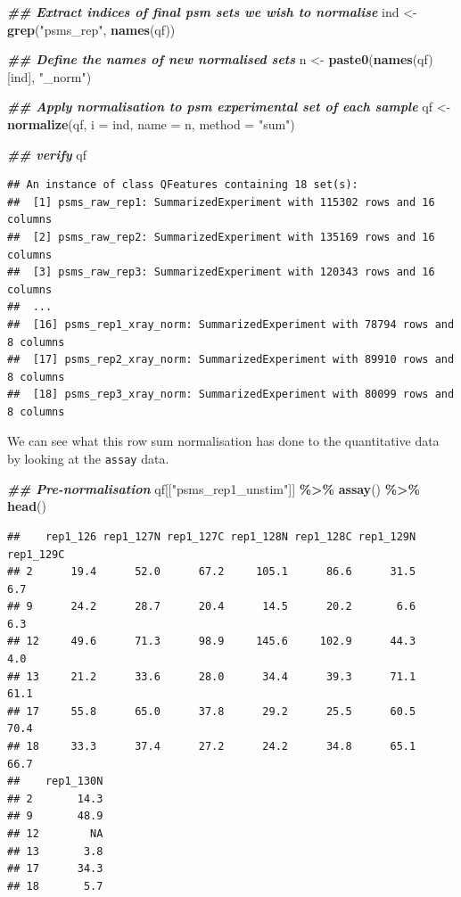 \documentclass[9pt,a4paper,]{extarticle}
\newenvironment{Shaded}{\begin{snugshade}}{\end{snugshade}}
\newcommand{\AttributeTok}[1]{\textcolor[rgb]{0.13,0.29,0.53}{#1}}
\newcommand{\DocumentationTok}[1]{\textcolor[rgb]{0.56,0.35,0.01}{\textbf{\textit{#1}}}}
\newcommand{\FunctionTok}[1]{\textcolor[rgb]{0.13,0.29,0.53}{\textbf{#1}}}
\newcommand{\NormalTok}[1]{#1}
\newcommand{\OtherTok}[1]{\textcolor[rgb]{0.56,0.35,0.01}{#1}}
\newcommand{\SpecialCharTok}[1]{\textcolor[rgb]{0.81,0.36,0.00}{\textbf{#1}}}
\newcommand{\StringTok}[1]{\textcolor[rgb]{0.31,0.60,0.02}{#1}}
\begin{document}
\begin{Shaded}
\begin{Highlighting}[]
\DocumentationTok{\#\# Extract indices of final psm sets we wish to normalise}
\NormalTok{ind }\OtherTok{\textless{}{-}} \FunctionTok{grep}\NormalTok{(}\StringTok{"psms\_rep"}\NormalTok{, }\FunctionTok{names}\NormalTok{(qf))}

\DocumentationTok{\#\# Define the names of new normalised sets}
\NormalTok{n }\OtherTok{\textless{}{-}} \FunctionTok{paste0}\NormalTok{(}\FunctionTok{names}\NormalTok{(qf)[ind], }\StringTok{"\_norm"}\NormalTok{)}

\DocumentationTok{\#\# Apply normalisation to psm experimental set of each sample}
\NormalTok{qf }\OtherTok{\textless{}{-}} \FunctionTok{normalize}\NormalTok{(qf, }
                \AttributeTok{i =}\NormalTok{ ind, }
                \AttributeTok{name =}\NormalTok{ n, }
                \AttributeTok{method =} \StringTok{"sum"}\NormalTok{)}

\DocumentationTok{\#\# verify}
\NormalTok{qf}
\end{Highlighting}
\end{Shaded}

\begin{verbatim}
## An instance of class QFeatures containing 18 set(s):
##  [1] psms_raw_rep1: SummarizedExperiment with 115302 rows and 16 columns 
##  [2] psms_raw_rep2: SummarizedExperiment with 135169 rows and 16 columns 
##  [3] psms_raw_rep3: SummarizedExperiment with 120343 rows and 16 columns 
##  ...
##  [16] psms_rep1_xray_norm: SummarizedExperiment with 78794 rows and 8 columns 
##  [17] psms_rep2_xray_norm: SummarizedExperiment with 89910 rows and 8 columns 
##  [18] psms_rep3_xray_norm: SummarizedExperiment with 80099 rows and 8 columns
\end{verbatim}

We can see what this row sum normalisation has done to the quantitative data by
looking at the \texttt{assay} data.

\begin{Shaded}
\begin{Highlighting}[]
\DocumentationTok{\#\# Pre{-}normalisation}
\NormalTok{qf[[}\StringTok{"psms\_rep1\_unstim"}\NormalTok{]] }\SpecialCharTok{\%\textgreater{}\%}
  \FunctionTok{assay}\NormalTok{() }\SpecialCharTok{\%\textgreater{}\%}
  \FunctionTok{head}\NormalTok{()}
\end{Highlighting}
\end{Shaded}

\begin{verbatim}
##    rep1_126 rep1_127N rep1_127C rep1_128N rep1_128C rep1_129N rep1_129C
## 2      19.4      52.0      67.2     105.1      86.6      31.5       6.7
## 9      24.2      28.7      20.4      14.5      20.2       6.6       6.3
## 12     49.6      71.3      98.9     145.6     102.9      44.3       4.0
## 13     21.2      33.6      28.0      34.4      39.3      71.1      61.1
## 17     55.8      65.0      37.8      29.2      25.5      60.5      70.4
## 18     33.3      37.4      27.2      24.2      34.8      65.1      66.7
##    rep1_130N
## 2       14.3
## 9       48.9
## 12        NA
## 13       3.8
## 17      34.3
## 18       5.7
\end{verbatim}
\end{document}
